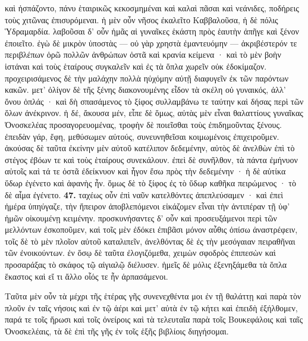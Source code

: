 \documentclass[a4paper, 11pt, oneside, polutonikogreek, german]{article}
\begin{document}
καὶ ἠσπάζοντο, πάνυ ἑταιρικῶς κεκοσμημέναι καὶ καλαὶ πᾶσαι καὶ νεάνιδες, ποδήρεις τοὺς χιτῶνας ἐπισυρόμεναι. ἡ μὲν οὖν νῆσος ἐκαλεῖτο Καββαλοῦσα, ἡ δὲ πόλις Ὑδραμαρδία. λαβοῦσαι δ' οὖν ἡμᾶς αἱ γυναῖκες ἑκάστη πρὸς ἑαυτὴν ἀπῆγε καὶ ξένον ἐποιεῖτο. ἐγὼ δὲ μικρὸν ὑποστὰς --- οὐ γὰρ χρηστὰ ἐμαντευόμην --- ἀκριβέστερόν τε περιβλέπων ὁρῶ πολλῶν ἀνθρώπων ὀστᾶ καὶ κρανία κείμενα · καὶ τὸ μὲν βοὴν ἱστάναι καὶ τοὺς ἑταίρους συγκαλεῖν καὶ ἐς τὰ ὅπλα χωρεῖν οὐκ ἐδοκίμαζον. προχειρισάμενος δὲ τὴν μαλάχην πολλὰ ηὐχόμην αὐτῇ διαφυγεῖν ἐκ τῶν παρόντων κακῶν. μετ' ὀλίγον δὲ τῆς ξένης διακονουμένης εἶδον τὰ σκέλη οὐ γυναικός, ἀλλ' ὄνου ὁπλάς · καὶ δὴ σπασάμενος τὸ ξίφος συλλαμβάνω τε ταύτην καὶ δήσας περὶ τῶν ὅλων ἀνέκρινον. ἡ δέ, ἄκουσα μέν, εἶπε δὲ ὅμως, αὐτὰς μὲν εἶναι θαλαττίους γυναῖκας Ὀνοσκελέας προσαγορευομένας, τροφὴν δὲ ποιεῖσθαι τοὺς ἐπιδημοῦντας ξένους. ἐπειδὰν γάρ, ἔφη, μεθύσωμεν αὐτούς, συνευνηθεῖσαι κοιμωμένοις ἐπιχειροῦμεν. ἀκούσας δὲ ταῦτα ἐκείνην μὲν αὐτοῦ κατέλιπον δεδεμένην, αὐτὸς δὲ ἀνελθὼν ἐπὶ τὸ στέγος ἐβόων τε καὶ τοὺς ἑταίρους συνεκάλουν. ἐπεὶ δὲ συνῆλθον, τὰ πάντα ἐμήνυον αὐτοῖς καὶ τά τε ὀστᾶ ἐδείκνυον καὶ ἦγον ἔσω πρὸς τὴν δεδεμένην · ἡ δὲ αὐτίκα ὕδωρ ἐγένετο καὶ ἀφανὴς ἦν. ὅμως δὲ τὸ ξίφος ἐς τὸ ὕδωρ καθῆκα πειρώμενος · τὸ δὲ αἷμα ἐγένετο. \textbf{47.} ταχέως οὖν ἐπὶ ναῦν κατελθόντες ἀπεπλεύσαμεν · καὶ ἐπεὶ ἡμέρα ὑπηύγαζε, τὴν ἤπειρον ἀποβλεπόμενοι εἰκάζομεν εἶναι τὴν ἀντιπέραν τῇ ὑφ' ἡμῶν οἰκουμένῃ κειμένην. προσκυνήσαντες δ' οὖν καὶ προσευξάμενοι περὶ τῶν μελλόντων ἐσκοποῦμεν, καὶ τοῖς μὲν ἐδόκει ἐπιβᾶσι μόνον αὖθις ὀπίσω ἀναστρέφειν, τοῖς δὲ τὸ μὲν πλοῖον αὐτοῦ καταλιπεῖν, ἀνελθόντας δὲ ἐς τὴν μεσόγαιαν πειραθῆναι τῶν ἐνοικούντων. ἐν ὅσῳ δὲ ταῦτα ἐλογιζόμεθα, χειμὼν σφοδρὸς ἐπιπεσὼν καὶ προσαράξας τὸ σκάφος τῷ αἰγιαλῷ διέλυσεν. ἡμεῖς δὲ μόλις ἐξενηξάμεθα τὰ ὅπλα ἕκαστος καὶ εἴ τι ἄλλο οἷός τε ἦν ἁρπασάμενοι.

Ταῦτα μὲν οὖν τὰ μέχρι τῆς ἑτέρας γῆς συνενεχθέντα μοι ἐν τῇ θαλάττῃ καὶ παρὰ τὸν πλοῦν ἐν ταῖς νήσοις καὶ ἐν τῷ ἀέρι καὶ μετ' αὐτὰ ἐν τῷ κήτει καὶ ἐπειδὴ ἐξήλθομεν, παρά τε τοῖς ἥρωσι καὶ τοῖς ὀνείροις καὶ τὰ τελευταῖα παρὰ τοῖς Βουκεφάλοις καὶ ταῖς Ὀνοσκελέαις, τὰ δὲ ἐπὶ τῆς γῆς ἐν τοῖς ἑξῆς βιβλίοις διηγήσομαι.
\clearpage
\end{document}
